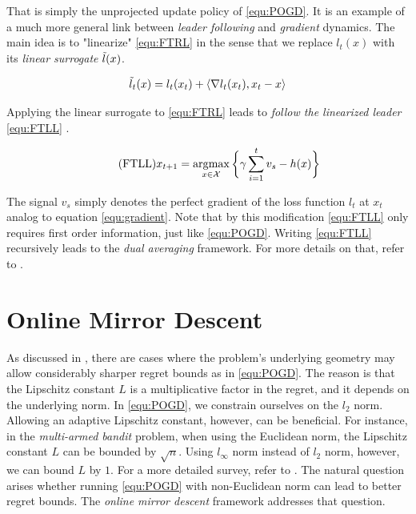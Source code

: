 That is simply the unprojected update policy of \ref{equ:POGD}. It is an example of a much more general link between \textit{leader following} and \textit{gradient} dynamics. The main idea is to "linearize" \ref{equ:FTRL} in the sense that we replace $l_t(x)$ with its \textit{linear surrogate} $\Tilde{l}(x)$.

\begin{equation*}
    \Tilde{l}_t(x) = l_t(x_t) + \langle \nabla l_t(x_t),x_t-x \rangle
\end{equation*}

Applying the linear surrogate to \ref{equ:FTRL} leads to \textit{follow the linearized leader} \ref{equ:FTLL} \cite{HDRmertikopoulos}. 

\begin{equation}
    \tag{FTLL}
    x_{t+1} = \operatorname*{\arg\!\max}_{x \in \mathcal{X}} \bigg\{\gamma\sum_{i=1}^t v_s - h(x)\bigg\}
    \label{equ:FTLL}
\end{equation}

The signal $v_s$ simply denotes the perfect gradient of the loss function $l_t$ at $x_t$ analog to equation \ref{equ:gradient}. Note that by this modification \ref{equ:FTLL} only requires first order information, just like \ref{equ:POGD}. Writing \ref{equ:FTLL} recursively leads to the \textit{dual averaging} framework. For more details on that, refer to \cite{HDRmertikopoulos, mertikopoulos}.


\section{Online Mirror Descent}\label{section:OnlineMirrorDescent}

As discussed in \cite{shalev, HDRmertikopoulos}, there are cases where the problem's underlying geometry may allow considerably sharper regret bounds as in \ref{equ:POGD}. The reason is that the Lipschitz constant $L$ is a multiplicative factor in the regret, and it depends on the underlying norm. In \ref{equ:POGD}, we constrain ourselves on the $l_2$ norm. Allowing an adaptive Lipschitz constant, however, can be beneficial. For instance, in the \textit{multi-armed bandit} problem, when using the Euclidean norm, the Lipschitz constant $L$ can be bounded by $\sqrt{n}$. Using $l_\infty$ norm instead of $l_2$ norm, however, we can bound $L$ by $1$. For a more detailed survey, refer to \cite{shalev, HDRmertikopoulos}. The natural question arises whether running \ref{equ:POGD} with non-Euclidean norm can lead to better regret bounds. The \textit{online mirror descent} framework addresses that question.\\


